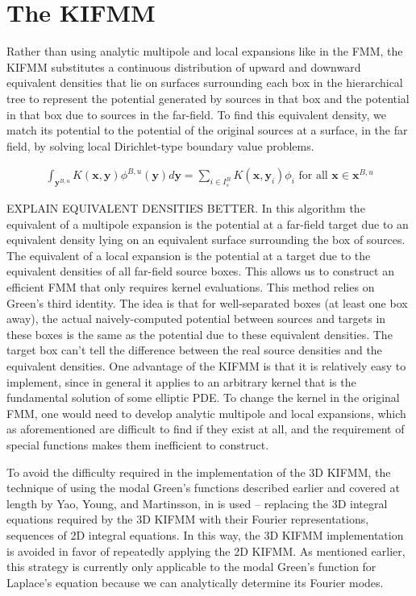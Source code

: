\documentclass[11pt, oneside]{article}   	%
\begin{document}
\section{The KIFMM}
Rather than using analytic multipole and local expansions like in the FMM, the KIFMM substitutes a continuous distribution of upward and downward equivalent densities that lie on surfaces surrounding each box in the hierarchical tree to represent the potential generated by sources in that box and the potential in that box due to sources in the far-field. To find this equivalent density, we match its potential to the potential of the original sources at a surface, in the far field, by solving local Dirichlet-type boundary value problems.

\begin{align}
\int_{\mathbf{y}^{B,u}}{K(\mathbf{x},\mathbf{y})}\phi^{B,u}{(\mathbf{y})}d\mathbf{y}=\sum\limits_{i\in I_s^B} K(\mathbf{x},\mathbf{y}_i)\phi_i\mbox{ for all }\mathbf{x}\in\mathbf{x}^{B,u}
\end{align}

EXPLAIN EQUIVALENT DENSITIES BETTER. In this algorithm the equivalent of a multipole expansion is the potential at a far-field target due to an equivalent density lying on an equivalent surface surrounding the box of sources. The equivalent of a local expansion is the potential at a target due to the equivalent densities of all far-field source boxes. This allows us to construct an efficient FMM that only requires kernel evaluations. This method relies on Green's third identity. The idea is that for well-separated boxes (at least one box away), the actual naively-computed potential between sources and targets in these boxes is the same as the potential due to these equivalent densities. The target box can't tell the difference between the real source densities and the equivalent densities. One advantage of the KIFMM is that it is relatively easy to implement, since in general it applies to an arbitrary kernel that is the fundamental solution of some elliptic PDE. To change the kernel in the original FMM, one would need to develop analytic multipole and local expansions, which as aforementioned are difficult to find if they exist at all, and the requirement of special functions makes them inefficient to construct.

To avoid the difficulty required in the implementation of the 3D KIFMM, the technique of using the modal Green's functions described earlier and covered at length by Yao, Young, and Martinsson, in \cite{YYM} is used -- replacing the 3D integral equations required by the 3D KIFMM with their Fourier representations, sequences of 2D integral equations. In this way, the 3D KIFMM implementation is avoided in favor of repeatedly applying the 2D KIFMM. As mentioned earlier, this strategy is currently only applicable to the modal Green's function for Laplace's equation because we can analytically determine its Fourier modes.
\end{document}
